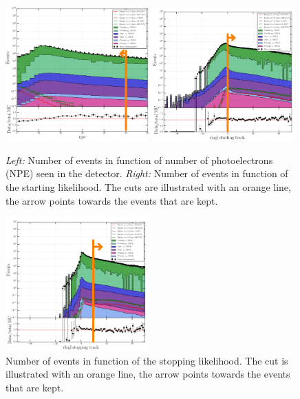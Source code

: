 \begin{figure}[ht]
\centering
\includegraphics[width=0.49\textwidth]{chapter8/img/L3_zenithcut_gr_1p4835298642_rloglcut_less_15_1D_stack_npe.png}
\includegraphics[width=0.49\textwidth]{chapter8/img/L3_zenithcut_gr_1p4835298642_rloglcut_less_15_npecut_less_50_1D_stack_finitereco_rllh_starting.png}
\caption{\textit{Left: }Number of events in function of number of photoelectrons (NPE) seen in the detector. \textit{Right: }Number of events in function of the starting likelihood. The cuts are illustrated with an orange line, the arrow points towards the events that are kept.}
\label{fig:level3cuts2}
\end{figure}

\begin{figure}[ht]
\centering
\includegraphics[width=0.49\textwidth]{chapter8/img/L3_zenithcut_gr_1p4835298642_rloglcut_less_15_npecut_less_50_startingtrackcut_hs_gr_0_1D_stack_finitereco_rllh_stopping.png}
\caption{Number of events in function of the stopping likelihood. The cut is illustrated with an orange line, the arrow points towards the events that are kept.}
\label{fig:level3cuts3}
\end{figure}

